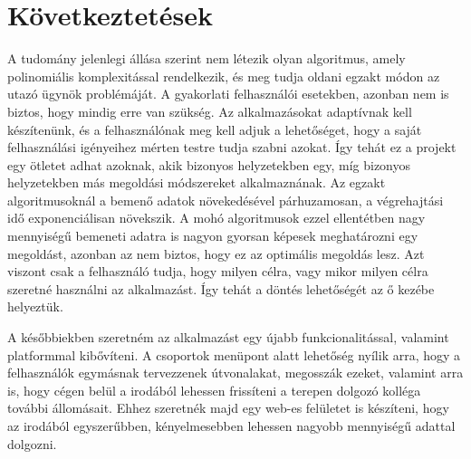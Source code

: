 \chapter{Következtetések}\label{ch:ALAP}

A tudomány jelenlegi állása szerint nem létezik olyan algoritmus, amely polinomiális komplexitással rendelkezik, és meg tudja oldani egzakt módon az utazó ügynök problémáját. A gyakorlati felhasználói esetekben, azonban nem is biztos, hogy mindig erre van szükség. Az alkalmazásokat adaptívnak kell készítenünk, és a felhasználónak meg kell adjuk a lehetőséget, hogy a saját felhasználási igényeihez mérten testre tudja szabni azokat. Így tehát ez a projekt egy ötletet adhat azoknak, akik bizonyos helyzetekben egy, míg bizonyos helyzetekben más megoldási módszereket alkalmaznának. Az egzakt algoritmusoknál a bemenő adatok növekedésével párhuzamosan, a végrehajtási idő exponenciálisan növekszik. A mohó algoritmusok ezzel ellentétben nagy mennyiségű bemeneti adatra is nagyon gyorsan képesek meghatározni egy megoldást, azonban az nem biztos, hogy ez az optimális megoldás lesz. Azt viszont csak a felhasználó tudja, hogy milyen célra, vagy mikor milyen célra szeretné használni az alkalmazást. Így tehát a döntés lehetőségét az ő kezébe helyeztük.

A későbbiekben szeretném az alkalmazást egy újabb funkcionalitással, valamint platformmal kibővíteni. A csoportok menüpont alatt lehetőség nyílik arra, hogy a felhasználók egymásnak tervezzenek útvonalakat, megosszák ezeket, valamint arra is, hogy cégen belül a irodából lehessen frissíteni a terepen dolgozó kolléga további állomásait. Ehhez szeretnék majd egy web-es felületet is készíteni, hogy az irodából egyszerűbben, kényelmesebben lehessen nagyobb mennyiségű adattal dolgozni.\cite{tsp_r_conc}\cite{pyconc}\cite{lin_kern}\cite{gt_problem}\cite{gt_and_appl}\cite{gt_alg_india}\cite{concorde}\cite{comp_tsp}\cite{auth}\cite{atsp}\cite{android}\cite{held}

